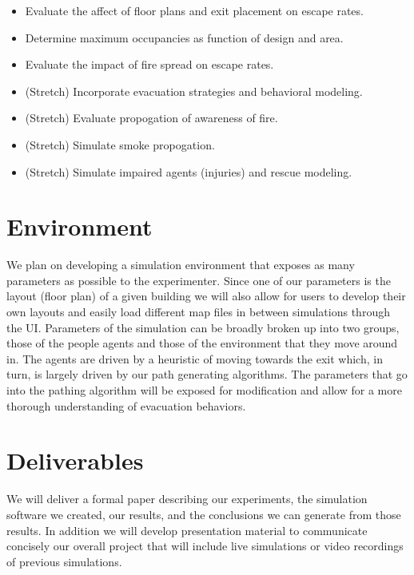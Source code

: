 \documentclass[12pt,letterpaper]{article}
\begin{document}
\begin{itemize}
\item Evaluate the affect of floor plans and exit placement on escape rates.
\item Determine maximum occupancies as function of design and area.
\item Evaluate the impact of fire spread on escape rates.
\item (Stretch) Incorporate evacuation strategies and behavioral modeling.
\item (Stretch) Evaluate propogation of awareness of fire.
\item (Stretch) Simulate smoke propogation.
\item (Stretch) Simulate impaired agents (injuries) and rescue modeling.
\end{itemize}

\section {Environment}

We plan on developing a simulation environment that exposes as many parameters as possible to the experimenter. Since one of our parameters is the layout (floor plan) of a given building we will also allow for users to develop their own layouts and easily load different map files in between simulations through the UI. Parameters of the simulation can be broadly broken up into two groups, those of the people agents and those of the environment that they move around in. The agents are driven by a heuristic of moving towards the exit which, in turn, is largely driven by our path generating algorithms\cite{caparriniGeneralSolverNetLogo2018, kneidl}.  The parameters that go into the pathing algorithm will be exposed for modification and allow for a more thorough understanding of evacuation behaviors. 

\section {Deliverables}
We will deliver a formal paper describing our experiments, the simulation software we created, our results, and the conclusions we can generate from those results. In addition we will develop presentation material to communicate concisely our overall project that will include live simulations or video recordings of previous simulations.




\end{document}
